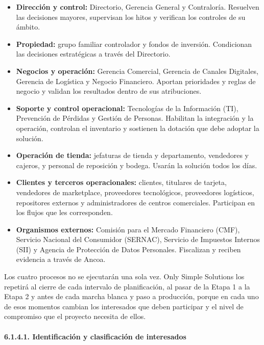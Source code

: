 \documentclass[11pt]{article}
\begin{document}
\begin{itemize}
\item
  \textbf{Dirección y control:} Directorio, Gerencia General y
  Contraloría. Resuelven las decisiones mayores, supervisan los hitos y
  verifican los controles de su ámbito.
\item
  \textbf{Propiedad:} grupo familiar controlador y fondos de inversión.
  Condicionan las decisiones estratégicas a través del Directorio.
\item
  \textbf{Negocios y operación:} Gerencia Comercial, Gerencia de Canales
  Digitales, Gerencia de Logística y Negocio Financiero. Aportan
  prioridades y reglas de negocio y validan los resultados dentro de sus
  atribuciones.
\item
  \textbf{Soporte y control operacional:} Tecnologías de la Información
  (TI), Prevención de Pérdidas y Gestión de Personas. Habilitan la
  integración y la operación, controlan el inventario y sostienen la
  dotación que debe adoptar la solución.
\item
  \textbf{Operación de tienda:} jefaturas de tienda y departamento,
  vendedores y cajeros, y personal de reposición y bodega. Usarán la
  solución todos los días.
\item
  \textbf{Clientes y terceros operacionales:} clientes, titulares de
  tarjeta, vendedores de marketplace, proveedores tecnológicos,
  proveedores logísticos, repositores externos y administradores de
  centros comerciales. Participan en los flujos que les corresponden.
\item
  \textbf{Organismos externos:} Comisión para el Mercado Financiero
  (CMF), Servicio Nacional del Consumidor (SERNAC), Servicio de
  Impuestos Internos (SII) y Agencia de Protección de Datos Personales.
  Fiscalizan y reciben evidencia a través de Ancoa.
\end{itemize}

Los cuatro procesos no se ejecutarán una sola vez. Only Simple Solutions
los repetirá al cierre de cada intervalo de planificación, al pasar de la
Etapa 1 a la Etapa 2 y antes de cada marcha blanca y paso a producción,
porque en cada uno de esos momentos cambian los interesados que deben
participar y el nivel de compromiso que el proyecto necesita de ellos.

\paragraph{6.1.4.1. Identificación y clasificación de interesados}\label{6-1-4-1-identificacion-y-clasificacion-de-interesados}
\end{document}
